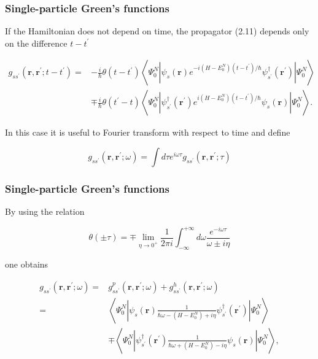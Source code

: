 \documentclass[compress]{beamer}
\begin{document}
\frame
{
\frametitle{Single-particle Green's functions}
\begin{small}
{\scriptsize
If the Hamiltonian does not depend on time, the propagator (2.11) depends only on the difference $t-t^{\prime}$

$$
\begin{aligned}
g_{s s^{\prime}}\left(\mathbf{r}, \mathbf{r}^{\prime} ; t-t^{\prime}\right)= & -\frac{i}{\hbar} \theta\left(t-t^{\prime}\right)\left\langle\Psi_{0}^{N}\left|\psi_{s}(\mathbf{r}) e^{-i\left(H-E_{0}^{N}\right)\left(t-t^{\prime}\right) / \hbar} \psi_{s^{\prime}}^{\dagger}\left(\mathbf{r}^{\prime}\right)\right| \Psi_{0}^{N}\right\rangle \\
& \mp \frac{i}{\hbar} \theta\left(t^{\prime}-t\right)\left\langle\Psi_{0}^{N}\left|\psi_{s^{\prime}}^{\dagger}\left(\mathbf{r}^{\prime}\right) e^{i\left(H-E_{0}^{N}\right)\left(t-t^{\prime}\right) / \hbar} \psi_{s}(\mathbf{r})\right| \Psi_{0}^{N}\right\rangle .
\end{aligned}
$$

In this case it is useful to Fourier transform with respect to time and define

$$
g_{s s^{\prime}}\left(\mathbf{r}, \mathbf{r}^{\prime} ; \omega\right)=\int d \tau e^{i \omega \tau} g_{s s^{\prime}}\left(\mathbf{r}, \mathbf{r}^{\prime} ; \tau\right)
$$

}
\end{small}
}


\frame
{
\frametitle{Single-particle Green's functions}
\begin{small}
{\scriptsize
By using the relation

$$
\theta( \pm \tau)=\mp \lim _{\eta \rightarrow 0^{+}} \frac{1}{2 \pi i} \int_{-\infty}^{+\infty} d \omega \frac{e^{-i \omega \tau}}{\omega \pm i \eta}
$$

one obtains

$$
\begin{aligned}
g_{s s^{\prime}}\left(\mathbf{r}, \mathbf{r}^{\prime} ; \omega\right)= & g_{s s^{\prime}}^{p}\left(\mathbf{r}, \mathbf{r}^{\prime} ; \omega\right)+g_{s s^{\prime}}^{h}\left(\mathbf{r}, \mathbf{r}^{\prime} ; \omega\right) \\
= & \left\langle\Psi_{0}^{N}\left|\psi_{s}(\mathbf{r}) \frac{1}{\hbar \omega-\left(H-E_{0}^{N}\right)+i \eta} \psi_{s^{\prime}}^{\dagger}\left(\mathbf{r}^{\prime}\right)\right| \Psi_{0}^{N}\right\rangle \\
& \mp\left\langle\Psi_{0}^{N}\left|\psi_{s^{\prime}}^{\dagger}\left(\mathbf{r}^{\prime}\right) \frac{1}{\hbar \omega+\left(H-E_{0}^{N}\right)-i \eta} \psi_{s}(\mathbf{r})\right| \Psi_{0}^{N}\right\rangle,
\end{aligned}
$$
}
\end{small}
}
\end{document}
